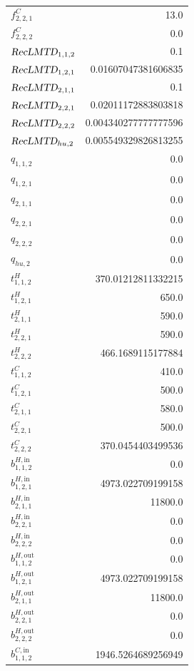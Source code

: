 \documentclass{article}%
\begin{document}
\begin{multicols*}{3}
\begin{supertabular}{lr}
	$f_{2,2,1}^{C}$ & 13.0 \\%
	$f_{2,2,2}^{C}$ & 0.0 \\%
	$\textsl{RecLMTD}_{1,1,2}$ & 0.1 \\%
	$\textsl{RecLMTD}_{1,2,1}$ & 0.01607047381606835 \\%
	$\textsl{RecLMTD}_{2,1,1}$ & 0.1 \\%
	$\textsl{RecLMTD}_{2,2,1}$ & 0.02011172883803818 \\%
	$\textsl{RecLMTD}_{2,2,2}$ & 0.004340277777777596 \\%
	$\textsl{RecLMTD}_{hu,2}$ & 0.005549329826813255 \\%
	$q_{1,1,2}$ & 0.0 \\%
	$q_{1,2,1}$ & 0.0 \\%
	$q_{2,1,1}$ & 0.0 \\%
	$q_{2,2,1}$ & 0.0 \\%
	$q_{2,2,2}$ & 0.0 \\%
	$q_{hu,2}$ & 0.0 \\%
	$t_{1,1,2}^{H}$ & 370.01212811332215 \\%
	$t_{1,2,1}^{H}$ & 650.0 \\%
	$t_{2,1,1}^{H}$ & 590.0 \\%
	$t_{2,2,1}^{H}$ & 590.0 \\%
	$t_{2,2,2}^{H}$ & 466.1689115177884 \\%
	$t_{1,1,2}^{C}$ & 410.0 \\%
	$t_{1,2,1}^{C}$ & 500.0 \\%
	$t_{2,1,1}^{C}$ & 580.0 \\%
	$t_{2,2,1}^{C}$ & 500.0 \\%
	$t_{2,2,2}^{C}$ & 370.0454403499536 \\%
	$b_{1,1,2}^{H,\text{in}}$ & 0.0 \\%
	$b_{1,2,1}^{H,\text{in}}$ & 4973.022709199158 \\%
	$b_{2,1,1}^{H,\text{in}}$ & 11800.0 \\%
	$b_{2,2,1}^{H,\text{in}}$ & 0.0 \\%
	$b_{2,2,2}^{H,\text{in}}$ & 0.0 \\%
	$b_{1,1,2}^{H,\text{out}}$ & 0.0 \\%
	$b_{1,2,1}^{H,\text{out}}$ & 4973.022709199158 \\%
	$b_{2,1,1}^{H,\text{out}}$ & 11800.0 \\%
	$b_{2,2,1}^{H,\text{out}}$ & 0.0 \\%
	$b_{2,2,2}^{H,\text{out}}$ & 0.0 \\%
	$b_{1,1,2}^{C,\text{in}}$ & 1946.5264689256949 \\%

\end{supertabular}
\end{multicols*}
\end{document}
